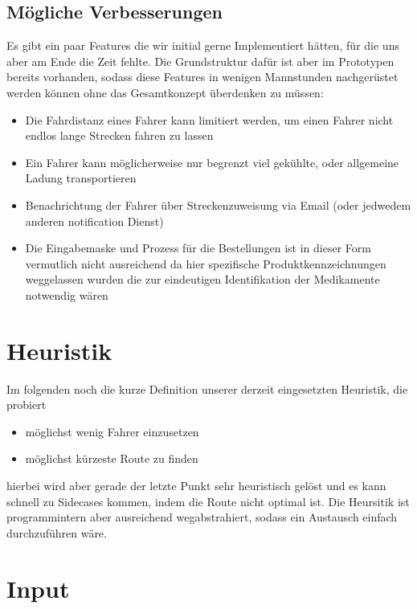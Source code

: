 \documentclass[a4]{article}
\begin{document}
\subsection{Mögliche Verbesserungen}

Es gibt ein paar Features die wir initial gerne Implementiert hätten, für die uns aber am Ende die Zeit fehlte. Die Grundstruktur dafür ist aber im Prototypen bereits vorhanden, sodass diese Features in wenigen
Mannstunden nachgerüstet werden können ohne das Gesamtkonzept überdenken zu müssen:

\begin{itemize}
\item Die Fahrdistanz eines Fahrer kann limitiert werden, um einen Fahrer nicht endlos lange Strecken fahren zu lassen
\item Ein Fahrer kann möglicherweise nur begrenzt viel gekühlte, oder allgemeine Ladung transportieren
\item Benachrichtung der Fahrer über Streckenzuweisung via Email (oder jedwedem anderen notification Dienst)
\item Die Eingabemaske und Prozess für die Bestellungen ist in dieser Form vermutlich nicht ausreichend da hier spezifische Produktkennzeichnungen weggelassen wurden die zur eindeutigen Identifikation der Medikamente notwendig wären
\end{itemize}

\section{Heuristik}

Im folgenden noch die kurze Definition unserer derzeit eingesetzten Heuristik, die probiert

\begin{itemize}
\item möglichst wenig Fahrer einzusetzen
\item möglichst kürzeste Route zu finden
\end{itemize}

hierbei wird aber gerade der letzte Punkt sehr heuristisch gelöst und es kann schnell zu Sidecases kommen, indem die Route nicht optimal ist. Die Heursitik ist programmintern aber ausreichend wegabstrahiert, sodass ein Austausch einfach durchzuführen wäre.

\section{Input}
\end{document}
